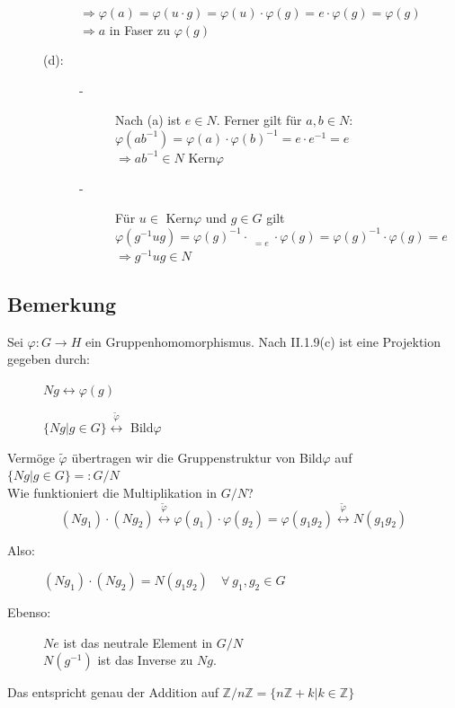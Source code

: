\begin{description}
\begin{description}
				$\Rightarrow \varphi(a)=\varphi(u \cdot g) = \varphi(u) \cdot \varphi(g) = e \cdot \varphi(g) = 
				\varphi(g)$\\
				$\Rightarrow a$ in Faser zu $\varphi(g)$
		\item[(d):] \quad
				\begin{description}
				\item[-] Nach (a) ist $e \in N$. Ferner gilt für $a,b \in N$:\\
						$\varphi(ab^{-1}) = \varphi(a) \cdot \varphi(b)^{-1} = e \cdot e^{-1} =e$\\
						$\Rightarrow ab^{-1} \in N$ Kern$\varphi$
				\item[-] Für $u \in$ Kern$\varphi$ und $g \in G$ gilt\\
					$\varphi(g^{-1}ug) = \varphi(g)^{-1} \cdot \mathop{\underbrace{\varphi(g)}}\limits_{=e} 
					\cdot \varphi(g) = \varphi(g)^{-1} \cdot \varphi(g) =e$\\
					$\Rightarrow g^{-1}ug \in N$
				\end{description}
	\end{description}
\end{description}
%
%
%
\subsection{Bemerkung}
Sei $\varphi: G \rightarrow H$ ein Gruppenhomomorphismus. Nach II.1.9(c) ist eine Projektion gegeben durch:
\begin{description}
	\item[] $Ng \longleftrightarrow \varphi(g)$
	\item[] $\{Ng|g \in G\} \mathop{\longleftrightarrow}\limits^{\tilde{\varphi}}$ Bild$\varphi$
\end{description}
Vermöge $\tilde{\varphi}$ übertragen wir die Gruppenstruktur von Bild$\varphi$ auf $\{Ng|g \in G\}  =: G/N$\\
Wie funktioniert die Multiplikation in $G/N$?
\begin{equation*}
	(Ng_{1})\cdot(Ng_{2}) \mathop{\longleftrightarrow}\limits^{\tilde{\varphi}} \varphi(g_{1}) \cdot 		
	\varphi(g_{2})=\varphi(g_{1}g_{2}) \mathop{\longleftrightarrow}\limits^{\tilde{\varphi}} N(g_{1}g_{2})
\end{equation*}
\begin{description}
	\item[Also:] $(Ng_{1})\cdot(Ng_{2}) =  N(g_{1}g_{2}) \quad \forall \ g_{1},g_{2} \in G$
	\item[Ebenso:] $Ne$ ist das neutrale Element in $G/N$\\
			$N(g^{-1})$ ist das Inverse zu $Ng$.
\end{description}
Das entspricht genau der Addition auf $\mathbb{Z}/n\mathbb{Z} = \{n\mathbb{Z}+k|k\in\mathbb{Z}\}$